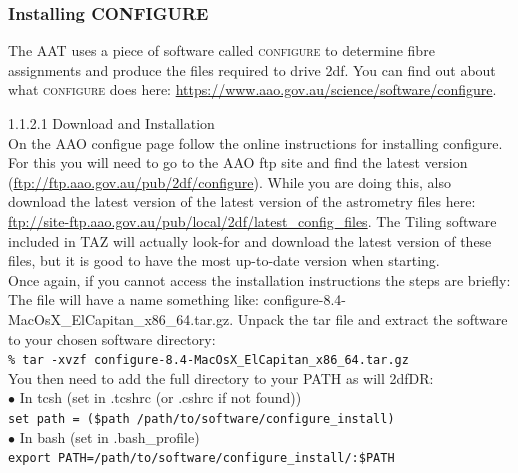 \documentclass[12pt]{article}
\begin{document}
\subsubsection{Installing CONFIGURE}

The AAT uses a piece of software called \textsc{configure} to determine fibre assignments and produce the files required to drive 2df. You can find out about what \textsc{configure} does here: \url{https://www.aao.gov.au/science/software/configure}. 

\textsf{1.1.2.1 Download and Installation} \\

On the AAO configue page follow the online instructions for installing configure. For this you will need to go to the AAO ftp site and find the latest version (\url{ftp://ftp.aao.gov.au/pub/2df/configure}). While you are doing this, also download the latest version of the latest version of the astrometry files here: \url{ftp://site-ftp.aao.gov.au/pub/local/2df/latest_config_files}. The Tiling software included in TAZ will actually look-for and download the latest version of these files, but it is good to have the most up-to-date version when starting.  \\



Once again, if you cannot access the installation instructions the steps are briefly: \\

The file will have a name something like: configure-8.4-MacOsX\_ElCapitan\_x86\_64.tar.gz. Unpack the tar file and extract the software to your chosen software directory:\\

\hspace{10mm} \texttt{\% tar -xvzf configure-8.4-MacOsX\_ElCapitan\_x86\_64.tar.gz}\\

You then need to add the full directory to your PATH as will 2dfDR: \\


    $\bullet$ In tcsh (set in .tcshrc (or .cshrc if not found)) \\
   \hspace{10mm} \texttt{set path = (\$path /path/to/software/configure\_install)}\\

     $\bullet$ In bash (set in .bash\_profile) \\
    \hspace{10mm} \texttt{export PATH=/path/to/software/configure\_install/:\$PATH}\\
\end{document}
